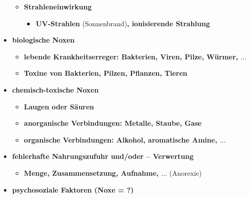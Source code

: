 \begin{itemize}
\begin{itemize}
\begin{itemize}
					\end{itemize}
				\item \textbf{Strahleneinwirkung}
					\begin{itemize}
						\item \textbf{UV-Strahlen} (Sonnenbrand)\textbf{, ionisierende Strahlung}
					\end{itemize}
			\end{itemize}
		\item \textbf{biologische Noxen}
			\begin{itemize}
				\item \textbf{lebende Krankheitserreger: Bakterien, Viren, Pilze, Würmer, $\dots$}
				\item \textbf{Toxine von Bakterien, Pilzen, Pflanzen, Tieren}
			\end{itemize}
		\item \textbf{chemisch-toxische Noxen}
			\begin{itemize}
				\item \textbf{Laugen oder Säuren}
				\item \textbf{anorganische Verbindungen: Metalle, Staube, Gase}
				\item \textbf{organische Verbindungen: Alkohol, aromatische Amine, $\dots$}
			\end{itemize}
		\item \textbf{fehlerhafte Nahrungszufuhr und/oder – Verwertung}
			\begin{itemize}
				\item \textbf{Menge, Zusammensetzung, Aufnahme, $\dots$} (Anorexie)
			\end{itemize}
		\item \textbf{psychosoziale Faktoren (Noxe = ?)}
	\end{itemize}

